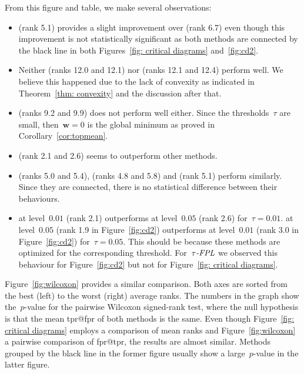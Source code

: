 From this figure and table, we make several observations:
\begin{itemize}
  \item \TopPushK (rank 5.1) provides a slight improvement over \TopPush (rank 6.7) even though this improvement is not statistically significant as both methods are connected by the black line in both Figures~\ref{fig: critical diagrams} and~\ref{fig:cd2}.
  \item Neither \Grill (ranks 12.0 and 12.1) nor \GrillNP (ranks 12.1 and 12.4) perform well. We believe this happened due to the lack of convexity as indicated in Theorem~\ref{thm: convexity} and the discussion after that.
  \item \TopMeanK (ranks 9.2 and 9.9) does not perform well either. Since the thresholds~$\tau$ are small, then~$\bm{w}=0$ is the global minimum as proved in Corollary~\ref{cor:topmean}.
  \item \PatMatNP (rank 2.1 and 2.6) seems to outperform other methods.
  \item \PatMat (ranks 5.0 and 5.4), \tauFPL (ranks 4.8 and 5.8) and \TopPushK (rank 5.1) perform similarly. Since they are connected, there is no statistical difference between their behaviours.
  \item \PatMatNP at level~$0.01$ (rank 2.1) outperforms \PatMatNP at level~$0.05$ (rank 2.6) for~$\tau=0.01$. \PatMatNP at level~$0.05$ (rank 1.9 in Figure~\ref{fig:cd2}) outperforms \PatMatNP at level~$0.01$ (rank 3.0 in Figure~\ref{fig:cd2}) for~$\tau=0.05$. This should be because these methods are optimized for the corresponding threshold. For~${\emph{$\tau$-FPL}}$ we observed this behaviour for Figure~\ref{fig:cd2} but not for Figure~\ref{fig: critical diagrams}.
\end{itemize}

Figure~\ref{fig:wilcoxon} provides a similar comparison. Both axes are sorted from the best (left) to the worst (right) average ranks. The numbers in the graph show the~$p$-value for the pairwise Wilcoxon signed-rank test, where the null hypothesis is that the mean tpr@fpr of both methods is the same. Even though Figure~\ref{fig: critical diagrams} employs a comparison of mean ranks and Figure~\ref{fig:wilcoxon} a pairwise comparison of fpr@tpr, the results are almost similar. Methods grouped by the black line in the former figure usually show a large~$p$-value in the latter figure.

